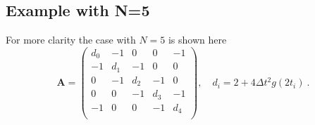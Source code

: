 \documentclass[11pt,a4paper]{article}
\begin{document}
\subsection*{Example with N=5}
For more clarity the case with $N=5$ is shown here
\begin{equation}
        \mathbf{A} = 
        \begin{pmatrix}
            d_0 & -1 & 0 & 0  & -1 \\
            -1  & d_1   & -1    & 0 & 0 \\
            0   &   -1  &   d_2 &   -1   & 0 \\
            0  & 0  & -1  & d_3 & -1  \\
            -1   & 0  &  0 & -1& d_4 \\
        \end{pmatrix}, \quad d_i = 2+ 4 \Delta t^2 g(2t_i)\ .
\end{equation}
\end{document}
